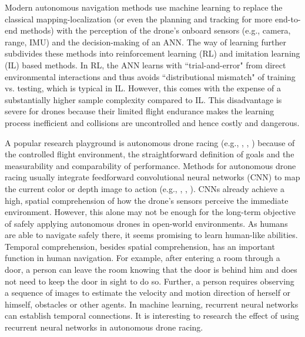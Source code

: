 Modern autonomous navigation methods use machine learning
to replace the classical mapping-localization 
(or even the planning and tracking for more end-to-end methods) 
with the perception of the drone's onboard sensors
(e.g., camera, range, IMU)
and the decision-making of an ANN.
The way of learning further subdivides these methods into
reinforcement learning (RL) and imitation learning (IL) based methods.
In RL, the ANN learns with ``trial-and-error" \cite{Sadeghi2016}
from direct environmental interactions 
and thus avoids ``distributional mismatch" \cite{RobotAutonomy2}  
of training vs. testing, which is typical in IL.
However, this comes with the expense of a
substantially higher sample complexity 
compared to IL. \cite{Zhu2017}
This disadvantage is severe for drones because 
their limited flight endurance 
makes the learning process inefficient 
and collisions are uncontrolled and 
hence costly and dangerous. \cite{Sadeghi2016}

A popular research playground is autonomous drone racing
(e.g., \cite{Moon2019}, \cite{Jung2018}, \cite{Song2021})
because of the controlled flight environment,
the straightforward definition of goals
and the measurability and comparability of performance.
Methods for autonomous drone racing usually
integrate feedforward
convolutional neural networks (CNN) 
to map the current color or depth image to action
(e.g., \cite{RojasPerez2020}, \cite{Kaufmann2019}, \cite{Jung2018a}).
CNNs already achieve 
a high, spatial comprehension of how the drone's sensors perceive
the immediate environment.
However, this alone may not
be enough for the long-term objective of safely 
applying autonomous drones in open-world environments.
As humans are able to navigate safely there,
it seems promising to learn human-like abilities.
Temporal comprehension,
besides spatial comprehension,
has an important function in human navigation. 
For example, 
after entering a room through a door, 
a person can leave the room knowing 
that the door is behind him and 
does not need to keep the door in sight to do so.
Further, a person requires 
observing a sequence of images to
estimate the velocity and motion direction of herself or himself, 
obstacles or other agents.
In machine learning, recurrent neural networks
can establish temporal connections.
It is interesting to research the 
effect of using recurrent neural networks in autonomous drone racing.









